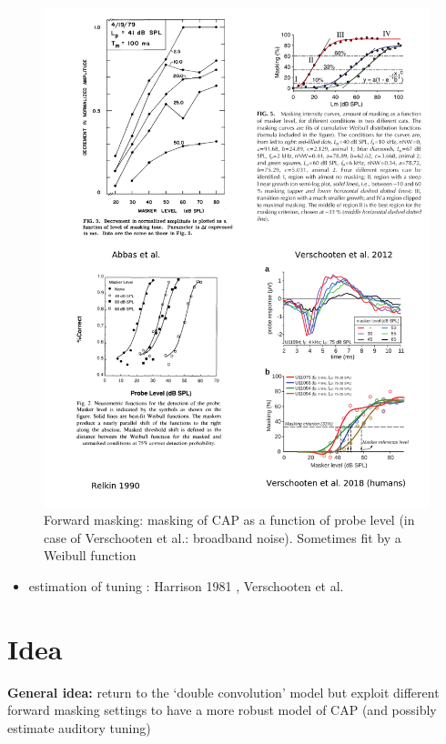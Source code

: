 \documentclass[]{article}
\providecommand{\tightlist}{%
  \setlength{\itemsep}{0pt}\setlength{\parskip}{0pt}}
\begin{document}
\begin{figure}
\centering
\includegraphics{./figures/forward_masking.png}
\caption{Forward masking: masking of CAP as a function of probe level
(in case of Verschooten et al.: broadband noise). Sometimes fit by a
Weibull function \label{fig:masking}}
\end{figure}

\begin{itemize}
\tightlist
\item
  estimation of tuning : Harrison 1981
  \citep{Harrison1981, Harrison1981a}, Verschooten et al.
\end{itemize}

\clearpage

\hypertarget{idea}{%
\section{Idea}\label{idea}}

\textbf{General idea: } return to the `double convolution' model but
exploit different forward masking settings to have a more robust model
of CAP (and possibly estimate auditory tuning)
\end{document}
